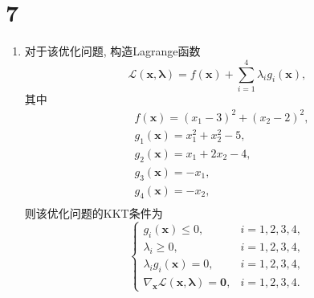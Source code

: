 \section*{7}

\begin{enumerate}[label=\alph*)]
    \item
        对于该优化问题, 构造Lagrange函数
        \begin{equation*}
            \mathcal{L}(\bm{x},\bm{\lambda})=f(\bm{x})+\sum_{i=1}^4\lambda_ig_i(\bm{x}),
        \end{equation*}
        其中
        \begin{align*}
            &f(\bm{x})=(x_1-3)^2+(x_2-2)^2, \\
            &g_1(\bm{x})=x_1^2+x_2^2-5, \\
            &g_2(\bm{x})=x_1+2x_2-4, \\
            &g_3(\bm{x})=-x_1, \\
            &g_4(\bm{x})=-x_2, \\
        \end{align*}
        则该优化问题的KKT条件为
        \begin{equation*}
            \begin{cases}
                g_i(\bm{x})\leq0, &i=1,2,3,4, \\
                \lambda_i\geq0, &i=1,2,3,4, \\
                \lambda_ig_i(\bm{x})=0, &i=1,2,3,4, \\
                \nabla_{\bm{x}}\mathcal{L}(\bm{x},\bm{\lambda})=\bm{0}, &i=1,2,3,4.
            \end{cases}
        \end{equation*}


\end{enumerate}
